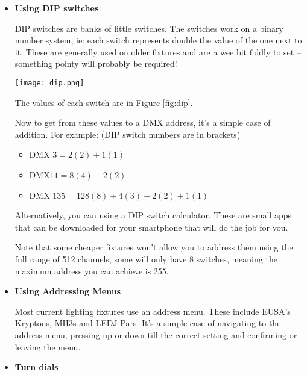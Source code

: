 \documentclass[14pt]{article} %
\begin{document}
\begin{itemize}

\item \textbf{Using DIP switches}

DIP switches are banks of little switches. The switches work on a binary number system, ie: each switch represents double the value of the one next to it. These are generally used on older fixtures and are a wee bit fiddly to set – something pointy will probably be required!

\begin{figure*}[h]
\begin{center}

\texttt{[image: dip.png]}
\caption{DIP switches and their values}
\label{fig:dip}

\end{center}
\end{figure*}

The values of each switch are in Figure \ref{fig:dip}.

Now to get from these values to a DMX address, it’s a simple case of addition. For example:
(DIP switch numbers are in brackets)
\begin{itemize}
\item	DMX $3 		= 	2  (2)   +   1  (1)$
\item	DMX$ 11			= 	8  (4)   +   2  (2)$
\item	DMX $135 	=	128 (8)  +  4 (3)  +  2  (2)  +  1  (1)$
\end{itemize}

Alternatively, you can using a DIP switch calculator. These are small apps that can be downloaded for your smartphone that will do the job for you.

Note that some cheaper fixtures won’t allow you to address them using the full range of 512 channels, some will only have 8 switches, meaning the maximum address you can achieve is 255.

\item \textbf{Using Addressing Menus}

Most current lighting fixtures use an address menu. These include EUSA’s Kryptons, MH3s and LEDJ Pars. It’s a simple case of navigating to the address menu, pressing up or down till the correct setting and confirming or leaving the menu.

\item \textbf{Turn dials}

\begin{figure*}[h]
\begin{center}


\end{center}
\end{figure*}
\end{itemize}
\end{document}
